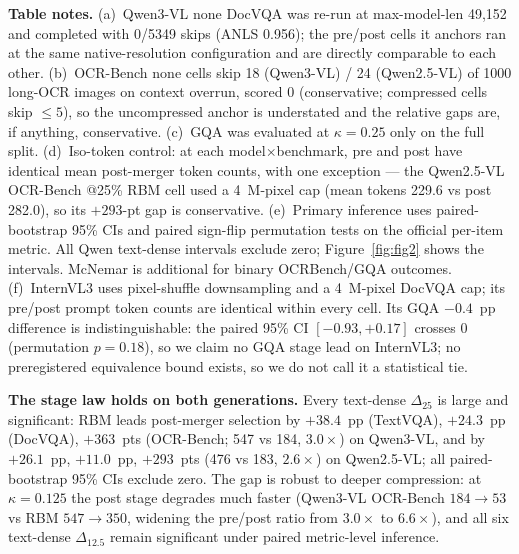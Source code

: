 \documentclass[journal]{IEEEtran}
\begin{document}
\begin{table}[t]
  \vspace{3pt}
  \footnotesize
  \textbf{Table notes.} (a)~Qwen3-VL none DocVQA was re-run at max-model-len
  49,152 and completed with 0/5349 skips (ANLS 0.956); the pre/post cells it
  anchors ran at the same native-resolution configuration and are directly
  comparable to each other. (b)~OCR-Bench none cells skip 18 (Qwen3-VL) / 24
  (Qwen2.5-VL) of 1000 long-OCR images on context overrun, scored 0
  (conservative; compressed cells skip $\leq 5$), so the uncompressed anchor is
  understated and the relative gaps are, if anything, conservative. (c)~GQA was
  evaluated at $\kappa = 0.25$ only on the full split. (d)~Iso-token control: at
  each model$\times$benchmark, pre and post have identical mean post-merger
  token counts, with one exception --- the Qwen2.5-VL OCR-Bench @25\% RBM cell
  used a 4~M-pixel cap (mean tokens 229.6 vs post 282.0), so its $+293$-pt gap
  is conservative. (e)~Primary inference uses paired-bootstrap 95\% CIs and
  paired sign-flip permutation tests on the official per-item metric. All Qwen
  text-dense intervals exclude zero; Figure~\ref{fig:fig2} shows the intervals.
  McNemar is additional for binary OCRBench/GQA outcomes. (f)~InternVL3 uses pixel-shuffle
  downsampling and a 4~M-pixel DocVQA cap; its pre/post prompt token counts are
  identical within every cell. Its GQA $-0.4$~pp difference is
  indistinguishable: the paired 95\% CI $[-0.93, +0.17]$ crosses 0 (permutation
  $p = 0.18$), so we claim no GQA stage lead on InternVL3; no preregistered
  equivalence bound exists, so we do not call it a statistical tie.
\end{table}

\textbf{The stage law holds on both generations.} Every text-dense
$\Delta_{25}$ is large and significant: RBM leads post-merger selection by
$+38.4$~pp (TextVQA), $+24.3$~pp (DocVQA), $+363$~pts (OCR-Bench; 547 vs 184,
$3.0\times$) on Qwen3-VL, and by $+26.1$~pp, $+11.0$~pp, $+293$~pts (476 vs 183,
$2.6\times$) on Qwen2.5-VL; all paired-bootstrap 95\% CIs exclude zero. The gap is robust to
deeper compression: at $\kappa = 0.125$ the post stage degrades much faster
(Qwen3-VL OCR-Bench $184 \to 53$ vs RBM $547 \to 350$, widening the pre/post
ratio from $3.0\times$ to $6.6\times$), and all six text-dense $\Delta_{12.5}$
remain significant under paired metric-level inference.
\end{document}
